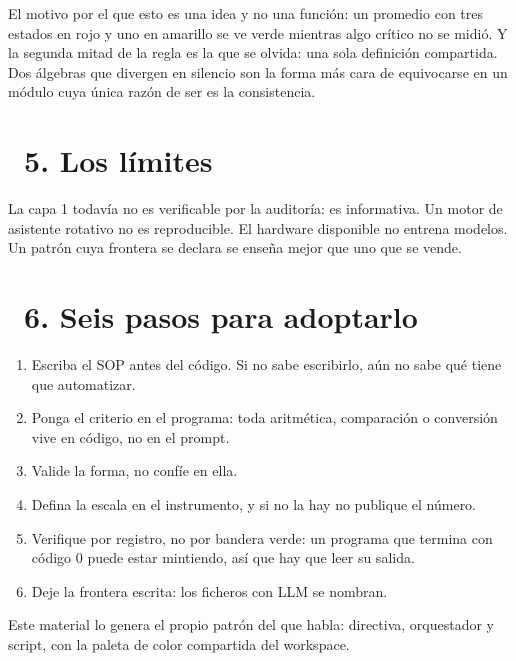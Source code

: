 \documentclass[11pt,a4paper]{article}
\newcommand{\iconotexto}[2]{\textcolor{cyanNeon}{\faIcon{#1}}~#2}
\begin{document}
El motivo por el que esto es una idea y no una función: un promedio con tres
estados en rojo y uno en amarillo se ve verde mientras algo crítico no se midió.
Y la segunda mitad de la regla es la que se olvida: una sola definición
compartida. Dos álgebras que divergen en silencio son la forma más cara de
equivocarse en un módulo cuya única razón de ser es la consistencia.

\section{\iconotexto{microchip}{5. Los límites}}
La capa 1 todavía no es verificable por la auditoría: es informativa. Un motor
de asistente rotativo no es reproducible. El hardware disponible no entrena
modelos. Un patrón cuya frontera se declara se enseña mejor que uno que se vende.

\section{\iconotexto{check-circle}{6. Seis pasos para adoptarlo}}
\begin{enumerate}
\item Escriba el SOP antes del código. Si no sabe escribirlo, aún no sabe qué
      tiene que automatizar.
\item Ponga el criterio en el programa: toda aritmética, comparación o
      conversión vive en código, no en el prompt.
\item Valide la forma, no confíe en ella.
\item Defina la escala en el instrumento, y si no la hay no publique el número.
\item Verifique por registro, no por bandera verde: un programa que termina con
      código 0 puede estar mintiendo, así que hay que leer su salida.
\item Deje la frontera escrita: los ficheros con LLM se nombran.
\end{enumerate}

\vfill
\begin{center}
\footnotesize\color{grisTexto}
Este material lo genera el propio patrón del que habla: directiva, orquestador y
script, con la paleta de color compartida del workspace.
\end{center}
\end{document}
